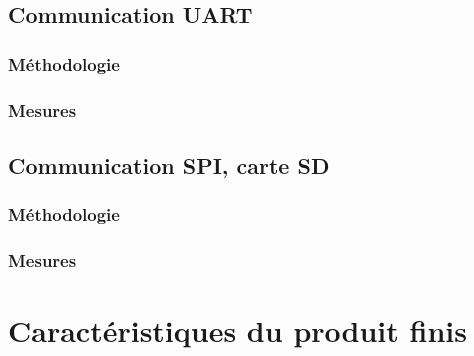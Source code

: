 \subsection{Communication UART}
{
	\subsubsection{Méthodologie}
	
	\subsubsection{Mesures}

}

\subsection{Communication SPI, carte SD}
{
	\subsubsection{Méthodologie}
	
	\subsubsection{Mesures}

}

\section{Caractéristiques du produit finis}
